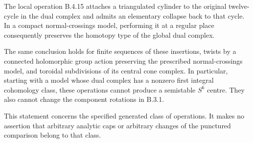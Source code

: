 \begin{proposition}
\label{push:B416}
The local operation B.4.15 attaches a triangulated
cylinder to the original twelve-cycle in the dual
complex and admits an elementary collapse back to that
cycle. In a compact normal-crossings model, performing
it at a regular place consequently preserves the
homotopy type of the global dual complex.

The same conclusion holds for finite sequences of these
insertions, twists by a connected holomorphic group
action preserving the prescribed normal-crossings
model, and toroidal subdivisions of its central cone
complex. In particular, starting with a model whose
dual complex has a nonzero first integral cohomology
class, these operations cannot produce a semistable
$S^6$ centre. They also cannot change the component
rotations in B.3.1.

This statement concerns the specified generated class
of operations. It makes no assertion that arbitrary
analytic caps or arbitrary changes of the punctured
comparison belong to that class.
\end{proposition}

